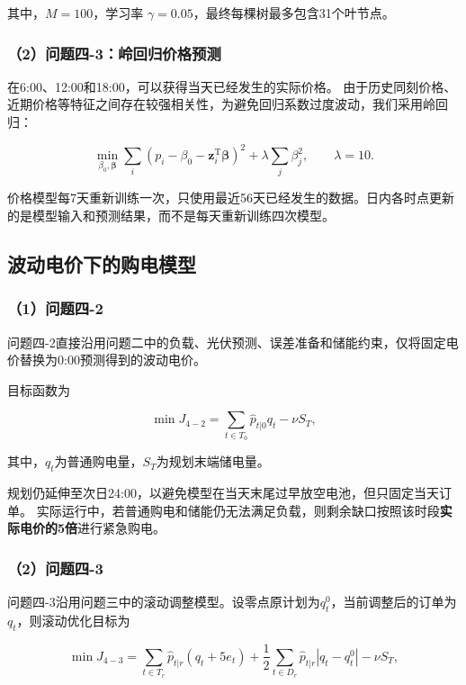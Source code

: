 其中，$M=100$，学习率 $\gamma=0.05$，最终每棵树最多包含31个叶节点。

\subsubsection*{（2）问题四-3：岭回归价格预测}

在6:00、12:00和18:00，可以获得当天已经发生的实际价格。
由于历史同刻价格、近期价格等特征之间存在较强相关性，为避免回归系数过度波动，我们采用岭回归：

\begin{equation}
\min_{\beta_0,\boldsymbol{\beta}}
\sum_i
\left(
p_i-\beta_0-\mathbf{z}_i^{\mathrm T}\boldsymbol{\beta}
\right)^2
+
\lambda
\sum_j\beta_j^2,
\qquad
\lambda=10.
\end{equation}

价格模型每7天重新训练一次，只使用最近56天已经发生的数据。日内各时点更新的是模型输入和预测结果，而不是每天重新训练四次模型。


\subsection{波动电价下的购电模型}

\subsubsection*{（1）问题四-2}

问题四-2直接沿用问题二中的负载、光伏预测、误差准备和储能约束，仅将固定电价替换为0:00预测得到的波动电价。

目标函数为

\begin{equation}
\min J_{4-2}
=
\sum_{t\in T_0}
\hat{p}_{t|0}q_t
-
\nu S_T,
\end{equation}

其中，$q_t$为普通购电量，$S_T$为规划末端储电量。

规划仍延伸至次日24:00，以避免模型在当天末尾过早放空电池，但只固定当天订单。
实际运行中，若普通购电和储能仍无法满足负载，则剩余缺口按照该时段\textbf{实际电价的5倍}进行紧急购电。

\subsubsection*{（2）问题四-3}

问题四-3沿用问题三中的滚动调整模型。设零点原计划为$q_t^0$，当前调整后的订单为$q_t$，则滚动优化目标为

\begin{equation}
\min J_{4-3}
=
\sum_{t\in T_r}
\hat{p}_{t|r}
\left(q_t+5e_t\right)
+
\frac{1}{2}
\sum_{t\in D_r}
\hat{p}_{t|r}
\left|q_t-q_t^0\right|
-
\nu S_T,
\end{equation}

